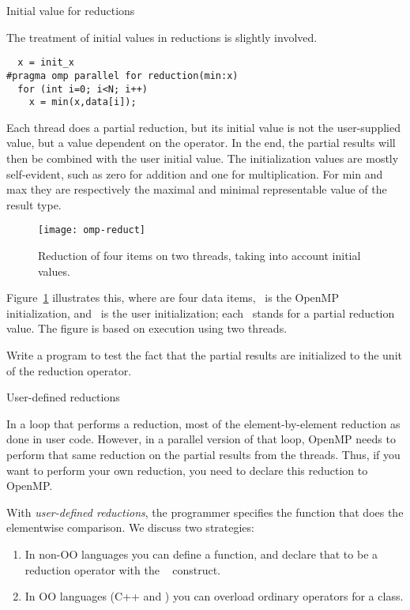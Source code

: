  {Initial value for reductions}

The treatment of initial values in reductions is slightly involved.
\begin{lstlisting}
  x = init_x
#pragma omp parallel for reduction(min:x)
  for (int i=0; i<N; i++)
    x = min(x,data[i]);
\end{lstlisting}
Each thread does a partial reduction, but its initial value is not the
user-supplied  value, but a value dependent on the
operator. In the end, the partial results will then be combined with
the user initial value.
The initialization values are mostly self-evident, such as zero for
addition and one for multiplication. For min and max they are
respectively the maximal and minimal representable value of the result type.

\begin{figure}[ht]
  \texttt{[image: omp-reduct]}
  \caption{Reduction of four items on two threads, taking into account
    initial values.}
  \label{fig:omp-reduct}  
\end{figure}
%
Figure~\ref{fig:omp-reduct} illustrates this, where  are
four data items, ~is the OpenMP initialization, and ~is the
user initialization; each ~stands for a partial reduction value.
The figure is based on execution using two threads.

\begin{exercise}
  Write a program to test the fact that the partial results
  are initialized to the unit of the reduction operator.
\end{exercise}

 {User-defined reductions}

In a loop that performs a reduction,
most of the element-by-element reduction as done in user code.
However, in a parallel version of that loop,
OpenMP needs to perform that same reduction on the partial results
from the threads.
Thus, if you want to perform your own reduction,
you need to declare this reduction to OpenMP.

With \emph{user-defined reductions}, the programmer specifies the
function that does the elementwise comparison.
We discuss two strategies:
\begin{enumerate}
\item In non-\ac{OO} languages you can define a function,
  and declare that to be a reduction operator with the
  ~ construct.
\item In \ac{OO} languages (C++ and )
  you can overload ordinary operators for a class.
\end{enumerate}

